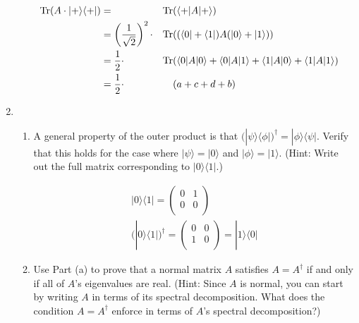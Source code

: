 \documentclass{article}
\newcommand{\bra}[1]{\langle #1|}
\newcommand{\ket}[1]{|#1\rangle}
\newcommand{\ketbra}[2]{\ket{#1}{\bra{#2}}}
\newcommand{\trace}{{\rm Tr}}
\begin{document}
\begin{enumerate}
\begin{enumerate}
                \begin{equation}
                  \begin{aligned}
                    \trace(A\cdot\ketbra{+}{+}) & =                                        & \trace & (\bra{+}A\ket{+})                                                 & \\
                                                & = \left(\frac{1}{\sqrt{2}}\right)^2\cdot & \trace & ((\bra{0}+\bra{1})A(\ket{0}+\ket{1}))                             & \\
                                                & = \frac12\cdot                           & \trace & (\bra{0}A\ket{0}+\bra{0}A\ket{1}+\bra{1}A\ket{0}+\bra{1}A\ket{1}) & \\
                                                & = \frac12\cdot                           &        & (a+c+d+b)
                  \end{aligned}
                \end{equation}
        \end{enumerate}
  \item %
        \begin{enumerate}
          \item %
                A general property of the outer product is that $(\ketbra{\psi}{\phi})^\dagger=\ketbra{\phi}{\psi}$. Verify that this holds for the case where $\ket{\psi}=\ket{0}$ and $\ket{\phi}=\ket{1}$. (Hint: Write out the full matrix corresponding to $\ketbra{0}{1}$.)

                \begin{equation}
                  \begin{aligned}
                    \ketbra{0}{1} = \left(
                    \begin{array}{cc}
                        0 & 1 \\
                        0 & 0 \\
                      \end{array}
                    \right) \\
                    (\ketbra{0}{1})^\dagger = \left(
                    \begin{array}{cc}
                        0 & 0 \\
                        1 & 0 \\
                      \end{array}
                    \right) = \ketbra{1}{0}
                  \end{aligned}
                \end{equation}
          \item %
                Use Part (a) to prove that a normal matrix $A$ satisfies $A=A^\dagger$ if and only if all of $A$'s eigenvalues are real. (Hint: Since $A$ is normal, you can start by writing $A$ in terms of its spectral decomposition. What does the condition $A=A^\dagger$ enforce in terms of $A$'s spectral decomposition?)


\end{enumerate}
\end{enumerate}
\end{document}
